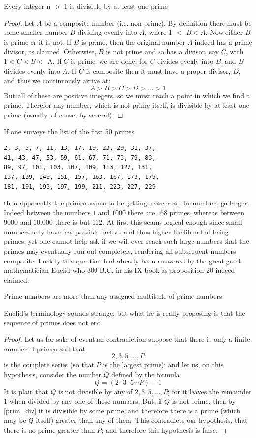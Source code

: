 \begin{proposition}\label{prim_div}
Every integer n $>$ 1 is divisible by at least one prime
\end{proposition}
\begin{proof}
Let $A$ be a composite number (i.e. non prime). By definition there must be
some smaller number $B$ dividing evenly into $A$, where 1 $<$ $B < A$. Now
either $B$ is prime or it is not. If $B$ is prime, then the original number
$A$ indeed has a prime divisor, as claimed. Otherwise, $B$ is not prime and so
has a divisor, say $C$, with $1 < C < B <$ A. If $C$ is prime, we are done, for
$C$ divides evenly into $B$, and $B$ divides evenly into $A$. If $C$ is
composite then it must have a proper divisor, $D$, and thus we continuously
arrive at:
\[
A > B > C > D > ... > 1
\]
But all of these are positive integers, so we must reach a point in which we
find a prime. Therefor any number, which is not prime itself, is divisible by
at least one prime (usually, of cause, by several).
\end{proof}

If one surveys the list of the first 50 primes
\begin{lstlisting}
2, 3, 5, 7, 11, 13, 17, 19, 23, 29, 31, 37,
41, 43, 47, 53, 59, 61, 67, 71, 73, 79, 83,
89, 97, 101, 103, 107, 109, 113, 127, 131,
137, 139, 149, 151, 157, 163, 167, 173, 179,
181, 191, 193, 197, 199, 211, 223, 227, 229
\end{lstlisting}
then apparently the primes seams to be getting scarcer as the numbers go larger.
Indeed between the numbers $1$ and $1000$ there are $168$ primes, whereas
between $9000$ and $10.000$ there is but $112$. At first this seams logical
enough since small numbers only have few possible factors and thus higher
likelihood of being primes, yet one cannot help ask if we will ever reach such
large numbers that the primes may eventually run out completely, rendering all
subsequent numbers composite. Luckily this question had already been answered
by the great greek mathematician Euclid who 300 B.C. in his IX book as
proposition 20 indeed claimed:

\begin{proposition}
Prime numbers are more than any assigned multitude of prime numbers.
\end{proposition}
Euclid's terminology sounds strange, but what he is really proposing is that
the sequence of primes does not end.
\begin{proof}
Let us for sake of eventual contradiction suppose that there is only a finite
number of primes and that
\[
2, 3, 5, ..., P
\]
is the complete series (so that $P$ is the largest prime); and let us, on this
hypothesis, consider the number $Q$ defined by the formula
\[
Q = (2 \cdot 3 \cdot 5 \cdots P) + 1
\]
It is plain that $Q$ is not divisible by any of $2, 3, 5, ..., P$; for it
leaves the remainder $1$ when divided by any one of these numbers. But, if $Q$
is not prime, then by \ref{prim_div} it is divisible by some prime, and
therefore there is a prime (which may be $Q$ itself) greater than any of them.
This contradicts our hypothesis, that there is no prime greater than $P$; and
therefore this hypothesis is false.
\end{proof}

